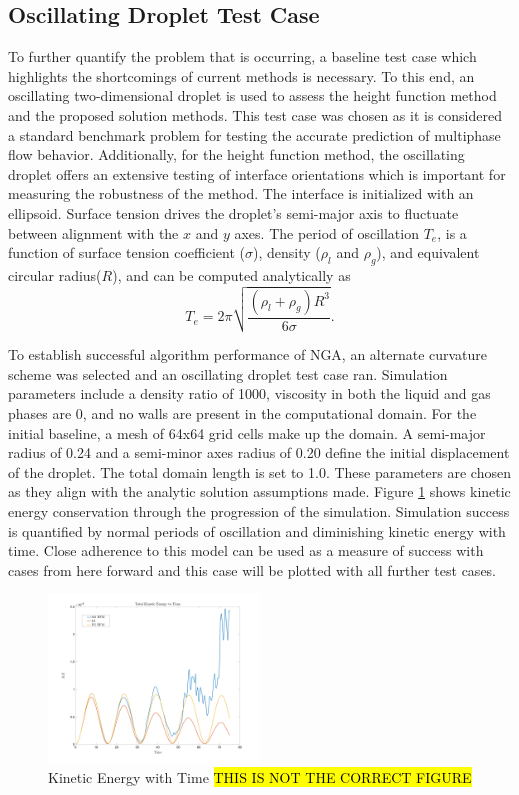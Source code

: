 \subsection{Oscillating Droplet Test Case}
To further quantify the problem that is occurring, a baseline test case which highlights the shortcomings of current methods is necessary. To this end, an oscillating two-dimensional droplet is used to assess the height function method and the proposed solution methods. This test case was chosen as it is considered a standard benchmark problem for testing the accurate prediction of multiphase flow behavior\cite{Salih2002}. Additionally, for the height function method, the oscillating droplet offers an extensive testing of interface orientations which is important for measuring the robustness of the method. The interface is initialized with an ellipsoid. Surface tension drives the droplet's semi-major axis to fluctuate between alignment with the $x$ and $y$ axes. The period of oscillation $T_{e}$, is a function of surface tension coefficient ($\sigma$), density ($\rho_l$ and $\rho_g$), and equivalent circular radius($R$), and can be computed analytically as~\cite{Rayleigh}
\begin{equation}
T_{e} = 2 \pi \sqrt{\frac{(\rho_{l}+\rho_{g})R^3}{6\sigma}}.
\label{period}
\end{equation}

To establish successful algorithm performance of NGA, an alternate curvature scheme was selected and an oscillating droplet test case ran. Simulation parameters include a density ratio of 1000, viscosity in both the liquid and gas phases are 0, and no walls are present in the computational domain. For the initial baseline, a mesh of 64x64 grid cells make up the domain. A semi-major radius of 0.24 and a semi-minor axes radius of 0.20 define the initial displacement of the droplet. The total domain length is set to 1.0. These parameters are chosen as they align with the analytic solution assumptions made. Figure \ref{fig:acesKE} shows kinetic energy conservation through the progression of the simulation. Simulation success is quantified by normal periods of oscillation and diminishing kinetic energy with time. Close adherence to this model can be used as a measure of success with cases from here forward and this case will be plotted with all further test cases. 
\begin{figure}[h]
	\centering
	\includegraphics[width=0.5\textwidth]{figs/KEvT}
	\caption{Kinetic Energy with Time \hl{THIS IS NOT THE CORRECT FIGURE}}
	\label{fig:acesKE}
\end{figure}

